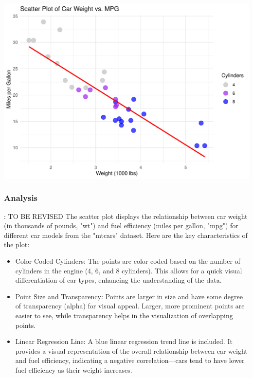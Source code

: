 \documentclass{article}\usepackage[]{graphicx}\usepackage[]{xcolor}
\makeatletter
\def\maxwidth{ %
  \ifdim\Gin@nat@width>\linewidth
    \linewidth
  \else
    \Gin@nat@width
  \fi
}
\newenvironment{kframe}{%
 \def\at@end@of@kframe{}%
 \ifinner\ifhmode%
  \def\at@end@of@kframe{\end{minipage}}%
  \begin{minipage}{\columnwidth}%
 \fi\fi%
 \def\FrameCommand##1{\hskip\@totalleftmargin \hskip-\fboxsep
 \colorbox{shadecolor}{##1}\hskip-\fboxsep
     \hskip-\linewidth \hskip-\@totalleftmargin \hskip\columnwidth}%
 \MakeFramed {\advance\hsize-\width
   \@totalleftmargin\z@ \linewidth\hsize
   \@setminipage}}%
 {\par\unskip\endMakeFramed%
 \at@end@of@kframe}
\newenvironment{knitrout}{}{} %
\makeatother
\begin{document}
\begin{knitrout}
\color{fgcolor}\begin{kframe}


{\ttfamily\noindent\itshape{}}\end{kframe}
\includegraphics[width=\maxwidth]{figure/scatter-plot-chunk-1} 
\end{knitrout}

\subsubsection{Analysis}: TO BE REVISED
The scatter plot displays the relationship between car weight (in thousands of pounds, "wt") and fuel efficiency (miles per gallon, "mpg") for different car models from the "mtcars" dataset. Here are the key characteristics of the plot:
\begin{itemize}
    \item Color-Coded Cylinders: The points are color-coded based on the number of cylinders in the engine (4, 6, and 8 cylinders). This allows for a quick visual differentiation of car types, enhancing the understanding of the data.
    \item Point Size and Transparency: Points are larger in size and have some degree of transparency (alpha) for visual appeal. Larger, more prominent points are easier to see, while transparency helps in the visualization of overlapping points.
    \item Linear Regression Line: A blue linear regression trend line is included. It provides a visual representation of the overall relationship between car weight and fuel efficiency, indicating a negative correlation—cars tend to have lower fuel efficiency as their weight increases.\\
\end{itemize}
    
\end{document}
